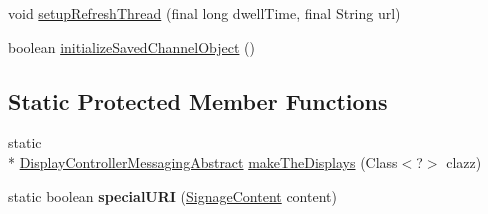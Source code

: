 \begin{DoxyCompactItemize}
\item 
void \hyperlink{classgov_1_1fnal_1_1ppd_1_1dd_1_1display_1_1client_1_1DisplayControllerMessagingAbstract_a29b0a1677df18d26fdc7c5efb123baa5}{setup\-Refresh\-Thread} (final long dwell\-Time, final String url)
\item 
boolean \hyperlink{classgov_1_1fnal_1_1ppd_1_1dd_1_1display_1_1client_1_1DisplayControllerMessagingAbstract_add2c82077c4f12238773e4dfb2fd54aa}{initialize\-Saved\-Channel\-Object} ()
\end{DoxyCompactItemize}
\subsection*{Static Protected Member Functions}
\begin{DoxyCompactItemize}
\item 
static \\*
\hyperlink{classgov_1_1fnal_1_1ppd_1_1dd_1_1display_1_1client_1_1DisplayControllerMessagingAbstract}{Display\-Controller\-Messaging\-Abstract} \hyperlink{classgov_1_1fnal_1_1ppd_1_1dd_1_1display_1_1client_1_1DisplayControllerMessagingAbstract_ad405437545b641b1c4d00d2267209376}{make\-The\-Displays} (Class$<$?$>$ clazz)
\item 
\hypertarget{classgov_1_1fnal_1_1ppd_1_1dd_1_1display_1_1client_1_1DisplayControllerMessagingAbstract_a78a7e10e4def66421424bd02c69611ab}{static boolean {\bfseries special\-U\-R\-I} (\hyperlink{interfacegov_1_1fnal_1_1ppd_1_1dd_1_1signage_1_1SignageContent}{Signage\-Content} content)}\label{classgov_1_1fnal_1_1ppd_1_1dd_1_1display_1_1client_1_1DisplayControllerMessagingAbstract_a78a7e10e4def66421424bd02c69611ab}

\end{DoxyCompactItemize}
